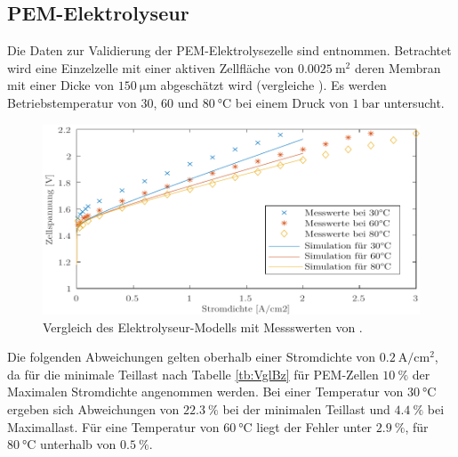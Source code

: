 \subsection{PEM-Elektrolyseur}
Die Daten zur Validierung der PEM-Elektrolysezelle sind \citet[S. 36]{tjarks_pem-elektrolyse-systeme_2017} entnommen. Betrachtet wird eine Einzelzelle mit einer aktiven Zellfläche von $\SI{0,0025}{\m\squared}$ deren Membran mit einer Dicke von $\SI{150}{\micro\m}$ abgeschätzt wird (vergleiche \citet{rashid_hydrogen_2015}).
Es werden Betriebstemperatur von $30$, $60$ und $\SI{80}{\degreeCelsius}$ bei einem Druck von $\SI{1}{\bar}$ untersucht.\\

\begin{figure}[h]
	\centering
		\includegraphics[scale=1]{Figures/ValidierungPEMEC}
		\caption{Vergleich des Elektrolyseur-Modells mit Messswerten von \citet{tjarks_pem-elektrolyse-systeme_2017}.}
\label{fig:ValPEMEC}	
\end{figure}

Die folgenden Abweichungen gelten oberhalb einer Stromdichte von $\SI{0,2}{\A\per\cm\squared}$, da für die minimale Teillast nach Tabelle \ref{tb:VglBz} für PEM-Zellen $\SI{10}{\%}$ der Maximalen Stromdichte angenommen werden. Bei einer Temperatur von $\SI{30}{\degreeCelsius}$ ergeben sich Abweichungen von  $\SI{22,3}{\%}$ bei der minimalen Teillast und $\SI{4,4}{\%}$ bei Maximallast. 
Für eine Temperatur von  $\SI{60}{\degreeCelsius}$ liegt der Fehler unter $\SI{2,9}{\%}$, für $\SI{80}{\degreeCelsius}$ unterhalb von $\SI{0,5}{\%}$.\\


